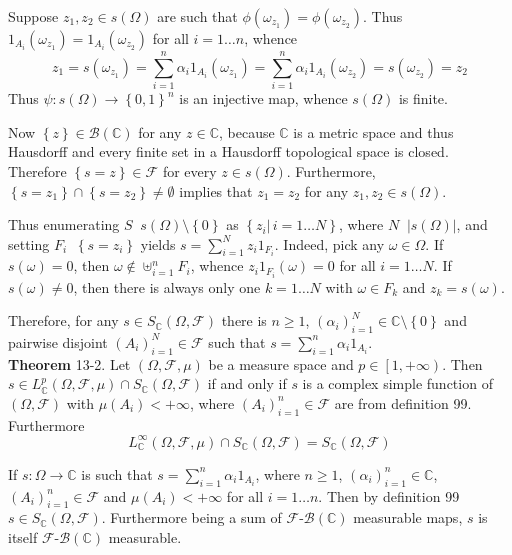 \documentclass[a4paper]{article}
\newcommand{\obj}[1]{\left\{ #1 \right \}}
\newcommand{\clop}[1]{\left [ #1 \right )}
\newcommand{\brac}[1]{\left ( #1 \right )}
\newcommand{\induc}[1]{\left . #1 \right \vert}
\newcommand{\abs}[1]{\left | #1 \right |}
\newcommand{\Cplx}{\mathbb{C}}
\newcommand{\Fcal}{\mathcal{F}}
\newcommand{\borel}[1]{\mathcal{B}\brac{#1}}
\newcommand{\defn}{\mathop{\overset{\Delta}{=}}\nolimits}
\begin{document}
Suppose $z_1, z_2\in s\brac{\Omega}$ are such that $\phi\brac{\omega_{z_1}}=\phi\brac{\omega_{z_2}}$. Thus $1_{A_i}\brac{\omega_{z_1}}=1_{A_i}\brac{\omega_{z_2}}$ for all $i=1\ldots n$, whence \[z_1 = s\brac{\omega_{z_1}} = \sum_{i=1}^n \alpha_i 1_{A_i}\brac{\omega_{z_1}} = \sum_{i=1}^n \alpha_i 1_{A_i}\brac{\omega_{z_2}} = s\brac{\omega_{z_2}} = z_2\] Thus $\psi:s\brac{\Omega}\to \obj{0,1}^n$ is an injective map, whence $s\brac{\Omega}$ is finite.

Now $\obj{z}\in \borel{\Cplx}$ for any $z\in \Cplx$, because $\Cplx$ is a metric space and thus Hausdorff and every finite set in a Hausdorff topological space is closed. Therefore $\obj{s=z}\in\Fcal$ for every $z\in s\brac{\Omega}$. Furthermore, $\obj{s=z_1}\cap \obj{s=z_2} \neq \emptyset$ implies that $z_1=z_2$ for any $z_1,z_2\in s\brac{\Omega}$.

Thus enumerating $S\defn s\brac{\Omega}\setminus\obj{0}$ as $\obj{\induc{z_i}\,i=1\ldots N}$, where $N\defn \abs{s\brac{\Omega}}$, and setting $F_i\defn \obj{s=z_i}$ yields $s=\sum_{i=1}^N z_i 1_{F_i}$. Indeed, pick any $\omega\in\Omega$. If $s\brac{\omega}=0$, then $\omega\notin \uplus_{i=1}^n F_i$, whence $z_i 1_{F_i}\brac{\omega}=0$ for all $i=1\ldots N$. If $s\brac{\omega}\neq 0$, then there is always only one $k=1\ldots N$ with $\omega\in F_k$ and $z_k = s\brac{\omega}$.

Therefore, for any $s\in S_\Cplx\brac{\Omega,\Fcal}$ there is $n\geq1$, $\brac{\alpha_i}_{i=1}^N\in \Cplx\setminus\obj{0}$ and pairwise disjoint $\brac{A_i}_{i=1}^N\in\Fcal$ such that $s=\sum_{i=1}^n \alpha_i 1_{A_i}$.\\

\label{thm:cplx_simple_lp_spaces} \noindent \textbf{Theorem} 13-2.
Let $\brac{\Omega, \Fcal, \mu}$ be a measure space and $p\in\clop{1, +\infty}$. Then $s\in L^p_\Cplx\brac{\Omega, \Fcal, \mu}\cap S_\Cplx\brac{\Omega, \Fcal}$ if and only if $s$ is a complex simple function of $\brac{\Omega, \Fcal}$ with $\mu\brac{A_i}<+\infty$, where $\brac{A_i}_{i=1}^n\in \Fcal$ are from definition 99. Furthermore \[L^\infty_\Cplx\brac{\Omega, \Fcal, \mu}\cap S_\Cplx\brac{\Omega, \Fcal} = S_\Cplx\brac{\Omega, \Fcal}\]

If $s:\Omega\to\Cplx$ is such that $s=\sum_{i=1}^n \alpha_i 1_{A_i}$, where $n\geq1$, $\brac{\alpha_i}_{i=1}^n\in \Cplx$, $\brac{A_i}_{i=1}^n\in \Fcal$ and $\mu\brac{A_i}<+\infty$ for all $i=1\ldots n$. Then by definition 99 $s\in S_\Cplx\brac{\Omega, \Fcal}$. Furthermore being a sum of $\Fcal$-$\borel{\Cplx}$ measurable maps, $s$ is itself $\Fcal$-$\borel{\Cplx}$ measurable.
\end{document}
